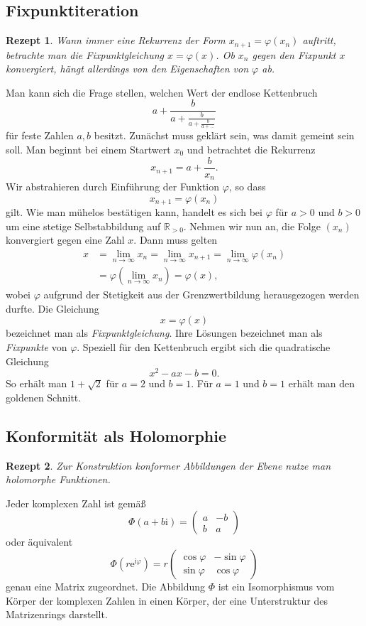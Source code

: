 \documentclass[a4paper,10pt,fleqn,twocolumn,twoside,dvipdfmx]{scrartcl}
\theoremstyle{rmbox}
\newtheorem{Rezept}{Rezept}[section]
\newcommand{\ee}{\mathrm{e}}
\newcommand{\ui}{\mathrm{i}}
\newcommand{\R}{\mathbb R}
\begin{document}
\subsection{Fixpunktiteration}

\begin{Rezept}
Wann immer eine Rekurrenz der Form $x_{n+1} = \varphi(x_n)$
auftritt, betrachte man die Fixpunktgleichung $x = \varphi(x)$. Ob
$x_n$ gegen den Fixpunkt $x$ konvergiert, hängt allerdings von den
Eigenschaften von $\varphi$ ab.
\end{Rezept}

\noindent
Man kann sich die Frage stellen, welchen Wert der endlose
Kettenbruch
\[a+\frac{b}{a+\frac{b}{a+\frac{b}{a+\ldots}}}\]
für feste Zahlen $a,b$ besitzt. Zunächst muss geklärt sein, was
damit gemeint sein soll. Man beginnt bei einem Startwert $x_0$
und betrachtet die Rekurrenz
\[x_{n+1} = a+\frac{b}{x_n}.\]
Wir abstrahieren durch Einführung der Funktion $\varphi$, so dass
\[x_{n+1} = \varphi(x_n)\]
gilt. Wie man mühelos bestätigen kann, handelt es sich bei $\varphi$
für $a>0$ und $b>0$ um eine stetige Selbstabbildung auf $\R_{>0}$.
Nehmen wir nun an, die Folge $(x_n)$ konvergiert gegen eine Zahl $x$.
Dann muss gelten
\begin{align*}
x &= \lim_{n\to\infty} x_{n} = \lim_{n\to\infty} x_{n+1}
= \lim_{n\to\infty}\varphi(x_n)\\
&= \varphi(\lim_{n\to\infty} x_n) = \varphi(x),
\end{align*}
wobei $\varphi$ aufgrund der Stetigkeit aus der Grenzwertbildung
herausgezogen werden durfte. Die Gleichung
\[x = \varphi(x)\]
bezeichnet man als \emph{Fixpunktgleichung}. Ihre Lösungen
bezeichnet man als \emph{Fixpunkte} von $\varphi$. Speziell für den
Kettenbruch ergibt sich die quadratische Gleichung
\[x^2 - ax - b = 0.\]
So erhält man $1+\sqrt{2}$ für $a=2$ und $b=1$.
Für $a=1$ und $b=1$ erhält man den goldenen Schnitt.

\newpage
\subsection{Konformität als Holomorphie}

\begin{Rezept}
Zur Konstruktion konformer Abbildungen der Ebene
nutze man holomorphe Funktionen.
\end{Rezept}

\noindent
Jeder komplexen Zahl ist gemäß
\[\Phi(a+b\ui) = \begin{pmatrix}a & -b\\ b & a\end{pmatrix}\]
oder äquivalent
\[\Phi(r\ee^{\ui\varphi}) = r\begin{pmatrix}
\cos\varphi & -\sin\varphi\\
\sin\varphi & \cos\varphi
\end{pmatrix}\]
genau eine Matrix zugeordnet. Die Abbildung $\Phi$ ist ein
Isomorphismus vom Körper der komplexen Zahlen in einen Körper,
der eine Unterstruktur des Matrizenrings darstellt.
\end{document}
